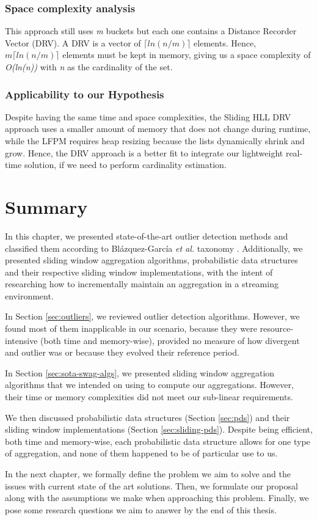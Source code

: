 \subsubsection*{Space complexity analysis}
This approach still uses \textit{m} buckets but each one contains a Distance Recorder Vector (DRV). A DRV is a vector of \textit{$\lceil ln(n/m) \rceil$} elements. Hence, \textit{$m \lceil ln(n/m) \rceil$} elements must be kept in memory, giving us a space complexity of \textit{O(ln(n))} with \textit{n} as the cardinality of the set.

\subsubsection*{Applicability to our Hypothesis}
Despite having the same time and space complexities, the Sliding HLL DRV approach uses a smaller amount of memory that does not change during runtime, while the LFPM requires heap resizing because the lists dynamically shrink and grow. Hence, the DRV approach is a better fit to integrate our lightweight real-time solution, if we need to perform cardinality estimation.


\section{Summary}

In this chapter, we presented state-of-the-art outlier detection methods and classified them according to Blázquez-García \emph{et al.} taxonomy \cite{Blazquez-Garcia-Review-Anomaly-Detection}. Additionally, we presented sliding window aggregation algorithms, probabilistic data structures and their respective sliding window implementations, with the intent of researching how to incrementally maintain an aggregation in a streaming environment.

In Section \ref{sec:outliers}, we reviewed outlier detection algorithms. However, we found most of them inapplicable in our scenario, because they were resource-intensive (both time and memory-wise), provided no measure of how divergent and outlier was or because they evolved their reference period.

In Section \ref{sec:sota-swag-algs}, we presented sliding window aggregation algorithms that we intended on using to compute our aggregations. However, their time or memory complexities did not meet our sub-linear requirements.

We then discussed probabilistic data structures (Section \ref{sec:pds}) and their sliding window implementations (Section \ref{sec:sliding-pds}). Despite being efficient, both time and memory-wise, each probabilistic data structure allows for one type of aggregation, and none of them happened to be of particular use to us.

In the next chapter, we formally define the problem we aim to solve and the issues with current state of the art solutions. Then, we formulate our proposal along with the assumptions we make when approaching this problem. Finally, we pose some research questions we aim to answer by the end of this thesis.
